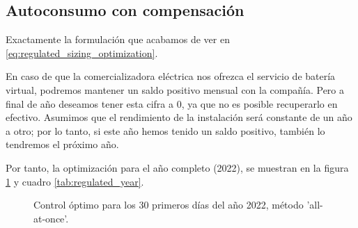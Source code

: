 \subsection{Autoconsumo con compensación}

Exactamente la formulación que acabamos de ver en
\eqref{eq:regulated_sizing_optimization}.

En caso de que la comercializadora eléctrica nos ofrezca el servicio de batería
virtual, podremos mantener un saldo positivo mensual con la compañía. Pero a
final de año deseamos tener esta cifra a 0, ya que no es posible recuperarlo en
efectivo. Asumimos que el rendimiento de la instalación será constante de un
año a otro; por lo tanto, si este año hemos tenido un saldo positivo, también
lo tendremos el próximo año.

Por tanto, la optimización para el año completo (2022), se muestran en la
figura \ref{fig:regulated_year} y cuadro \ref{tab:regulated_year}.

\begin{figure}[h] \centering
	\centering
	
	\caption{Control óptimo para los 30 primeros días del año 2022, método 'all-at-once'.}
	\label{fig:regulated_year}
\end{figure}

